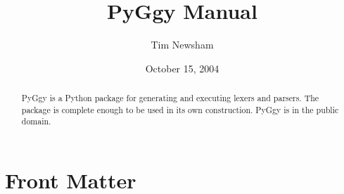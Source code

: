\documentclass{manual}
\title{PyGgy Manual}
\begin{document}
\author{Tim Newsham}
\date{October 15, 2004}
\maketitle

\ifhtml
\chapter*{Front Matter\label{front}}
\fi

\begin{abstract}


\noindent
PyGgy is a Python package for generating and executing lexers and
parsers.  The package is complete enough to be used in its own
construction.  PyGgy is in the public domain.

\end{abstract}

\tableofcontents







\end{document}
